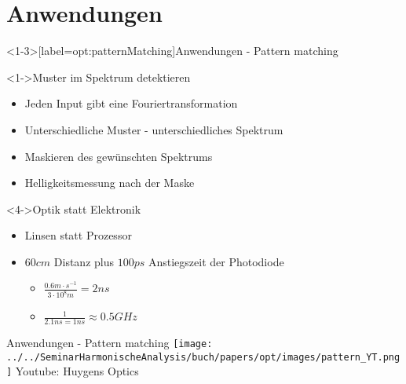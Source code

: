 \section{Anwendungen}

\begin{frame}<1-3>[label=opt:patternMatching]{Anwendungen - Pattern matching}
    \begin{block}<1->{Muster im Spektrum detektieren}
        \begin{itemize}
            \item<1-> Jeden Input gibt eine Fouriertransformation
            \item<1-> Unterschiedliche Muster - unterschiedliches Spektrum
            \item<2-> Maskieren des gewünschten Spektrums
            \item<3-> Helligkeitsmessung nach der Maske
        \end{itemize}
    \end{block}
    \begin{block}<4->{Optik statt Elektronik}
        \begin{itemize}
            \item Linsen statt Prozessor
            \item $60 cm$ Distanz plus $100 ps$ Anstiegszeit der Photodiode
            \begin{itemize}
                \item $\frac{0.6 m \cdot s^{-1}}{3 \cdot 10^8 m} = 2 ns$
                \item $\frac{1}{2.1 ns = 1 ns} \approx 0.5 GHz$
            \end{itemize}
        \end{itemize}
    \end{block}
\end{frame}

\begin{frame}{Anwendungen - Pattern matching}
    \centering
    \texttt{[image: ../../SeminarHarmonischeAnalysis/buch/papers/opt/images/pattern\_YT.png]}
    \vfill
    Youtube: Huygens Optics \cite{opt:YT:PatternRecognition}
\end{frame}


